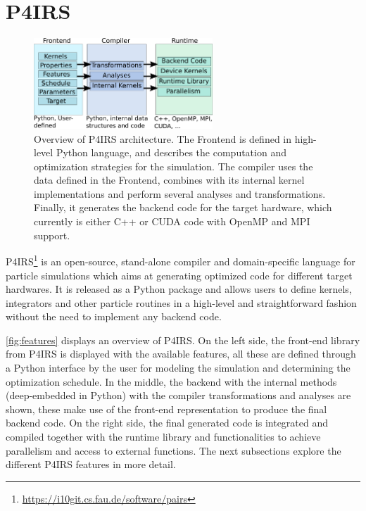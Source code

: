 \documentclass[Afour,sageh,times]{sagej}
\newcommand{\RMchange}[1]{{\color{blue} #1}}
\begin{document}
\section{P4IRS}
\label{sec:pairs}


\begin{figure}[htb]
  \centering
  \includegraphics[width=0.6\textwidth]{pairs_overview.png}
  \caption{Overview of P4IRS architecture. The Frontend is defined in high-level Python language, and describes the computation and optimization strategies for the simulation. The compiler uses the data defined in the Frontend, combines with its internal kernel implementations and perform several analyses and transformations. Finally, it generates the backend code for the target hardware, which currently is either C++ or CUDA code with OpenMP and MPI support.}
  \label{fig:features}
\end{figure}

P4IRS\footnote{\url{https://i10git.cs.fau.de/software/pairs}} is an open-source, stand-alone compiler and domain-specific language for particle simulations which aims at generating optimized code for different target hardwares.
It is released as a Python package and allows users to define kernels, integrators and other particle routines in a high-level and straightforward fashion without the need to implement any backend code.

\autoref{fig:features} displays an overview of P4IRS.
\RMchange{On} the left side, the front-end library from P4IRS is displayed with the available features, all these are defined through a Python interface by the user for modeling the simulation and determining the optimization schedule.
In the middle, the backend with the internal methods (deep-embedded in Python) with the compiler transformations and analyses are shown, these make use of the front-end representation to produce the final backend code.
\RMchange{On} the right side, the final generated code is integrated and compiled together with the runtime library and functionalities to achieve parallelism and access to external \RMchange{functions}.
The next subsections explore the different P4IRS features in more detail.
\end{document}
